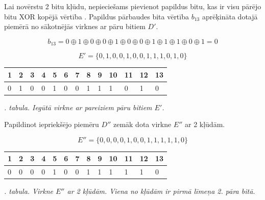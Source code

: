 \documentclass[12pt, a4paper, oneside, openright]{article}
\renewcommand{\thectables}{\arabic{ctables}}
\begin{document}
Lai novērstu 2 bitu kļūdu, nepieciešams pievienot papildus bitu, kas ir visu pārējo bitu XOR kopējā vērtība \cite{HenryS.Warren2012}.
Papildus pārbaudes bita vērtība $b_{13}$ aprēķināta dotajā piemērā no sākotnējās virknes ar pāru bitiem $D'$.

\begin{equation}\label{eq:eq_1}
b_{13} = 0 \oplus 1 \oplus 0 \oplus 0 \oplus 1 \oplus 0 \oplus 0 \oplus 1 \oplus 1 \oplus 1 \oplus 0 \oplus 1 = 0
\end{equation}

$$
E' = \{0,1,0,0,1,0,0,1,1,1,0,1,0\} 
$$
\begin{samepage}
\begin{table}[h]
\centering
\begin{tabular}{|l|l|l|l|l|l|l|l|l|l|l|l|l|}
\hline
1                         & 2                         & 3 & 4                         & 5 & 6 & 7 & 8                         & 9 & 10 & 11 & 12 & 13                        \\ \hline
\cellcolor[HTML]{FFFFC7}0 & \cellcolor[HTML]{FFFFC7}1 & 0 & \cellcolor[HTML]{FFFFC7}0 & 1 & 0 & 0 & \cellcolor[HTML]{FFFFC7}1 & 1 & 1  & 0  & 1  & \cellcolor[HTML]{ECF4FF}0 \\ \hline
\end{tabular}
\end{table}
\label{ctables:hamming_1}
\begin{center}
\footnotesize{
\textit{\thectables. tabula. Iegūtā virkne ar pareiziem pāru bitiem $E'$.}}
\end{center}
\end{samepage}

\newpage
Papildinot iepriekšējo piemēru $D''$ zemāk dota virkne $E''$ ar 2 kļūdām.

$$
E'' = \{0,0,0,0,1,0,0,1,1,1,1,1,0\} 
$$

\begin{samepage}
\begin{table}[h]
\centering
\begin{tabular}{|l|l|l|l|l|l|l|l|l|l|l|l|l|}
\hline
1                         & 2                         & 3 & 4                         & 5 & 6 & 7 & 8                         & 9 & 10 & 11                        & 12 & 13                        \\ \hline
\cellcolor[HTML]{FFFFC7}0 & \cellcolor[HTML]{FFCCC9}0 & 0 & \cellcolor[HTML]{FFFFC7}0 & 1 & 0 & 0 & \cellcolor[HTML]{FFFFC7}1 & 1 & 1  & \cellcolor[HTML]{FFCCC9}1 & 1  & \cellcolor[HTML]{ECF4FF}0 \\ \hline
\end{tabular}
\end{table}
\label{ctables:hamming_1}
\begin{center}
\footnotesize{
\textit{\thectables. tabula. Virkne $E''$ ar 2 kļūdām. Viena no kļūdām ir pirmā līmeņa 2. pāra bitā.}}
\end{center}
\end{samepage}
\end{document}
